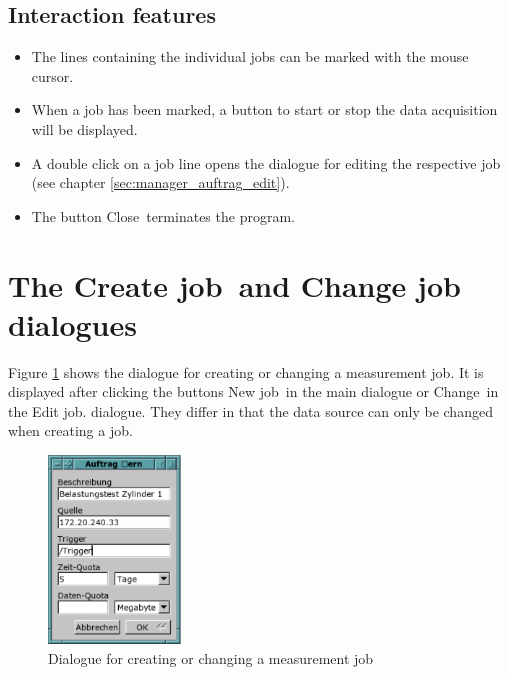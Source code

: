 \documentclass[a4paper,12pt,BCOR6mm,bibtotoc,idxtotoc]{scrbook}
\begin{document}

\subsection{Interaction features}

\begin{itemize} 
\item The lines containing the individual jobs can be marked with the mouse cursor. 
\item When a job has been marked, a button to start or stop the data acquisition will be displayed. 
\item A double click on a job line opens the dialogue for editing the respective job (see chapter \ref{sec:manager_auftrag_edit}). 
\item The button \glqq Close\grqq\ terminates the program. \end{itemize}


\section{The \glqq Create job\grqq\  and \glqq Change job dialogues\grqq} \label{sec:manager_auftrag_create}

Figure \ref{fig:dls_ctl_change} shows the dialogue for creating or changing a measurement job. It is displayed after clicking the buttons \glqq New job\grqq\ in the main dialogue or \glqq Change\grqq\ in the \glqq Edit job\grqq.  dialogue. They differ in that the data source can only be changed when creating a job.

\begin{figure}[tbh] \begin{center} \includegraphics[width=100pt]{bilder/ctl_change} \end{center} \caption{Dialogue for creating or changing a measurement job} \label{fig:dls_ctl_change} \end{figure}
\end{document}
